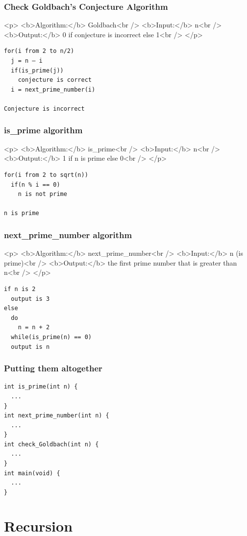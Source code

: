 \documentclass{../c-lecture}
\begin{document}
\begin{frame}[fragile]
  \frametitle{Check Goldbach’s Conjecture Algorithm}
  <p>
    <b>Algorithm:</b> Goldbach<br />
    <b>Input:</b> n<br />
    <b>Output:</b> 0 if conjecture is incorrect else 1<br />
  </p>
  \begin{verbatim}
for(i from 2 to n/2)
  j = n – i
  if(is_prime(j))
    conjecture is correct
  i = next_prime_number(i)

Conjecture is incorrect
  \end{verbatim}
\end{frame}

\begin{frame}[fragile]
  \frametitle{is_prime algorithm}
  <p>
    <b>Algorithm:</b> is_prime<br />
    <b>Input:</b> n<br />
    <b>Output:</b> 1 if n is prime else 0<br />
  </p>
  \begin{verbatim}
for(i from 2 to sqrt(n))
  if(n % i == 0)
    n is not prime

n is prime
  \end{verbatim}
\end{frame}

\begin{frame}[fragile]
  \frametitle{next_prime_number algorithm}
  <p>
    <b>Algorithm:</b> next_prime_number<br />
    <b>Input:</b> n (is prime)<br />
    <b>Output:</b> the first prime number that is greater than n<br />
  </p>
  \begin{verbatim}
if n is 2
  output is 3
else
  do
    n = n + 2
  while(is_prime(n) == 0)
  output is n
  \end{verbatim}
\end{frame}

\begin{frame}[fragile]
  \frametitle{Putting them altogether}
  \begin{verbatim}
int is_prime(int n) {
  ...
}
int next_prime_number(int n) {
  ...
}
int check_Goldbach(int n) {
  ...
}
int main(void) {
  ...
}
  \end{verbatim}
\end{frame}

\section{Recursion}
\end{document}
